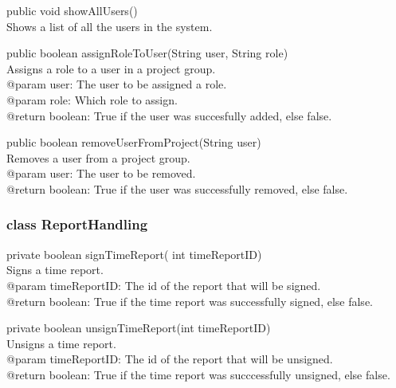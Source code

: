\documentclass[a4paper]{article}
\begin{document}
\begin{hangparas}{1.5em}{1}
public void showAllUsers()\\
Shows a list of all the users in the system.
\end{hangparas}

\vspace{5mm}
\begin{hangparas}{1.5em}{1}
public boolean assignRoleToUser(String user, String role)\\
Assigns a role to a user in a project group.\\
@param user: The user to be assigned a role.\\
@param role: Which role to assign.\\
@return boolean: True if the user was succesfully added, else false.
\end{hangparas}

\vspace{5mm}
\begin{hangparas}{1.5em}{1}
public boolean removeUserFromProject(String user)\\
Removes a user from a project group.\\
@param user: The user to be removed.\\
@return boolean: True if the user was successfully removed, else false.\\
\end{hangparas}


\subsubsection{class ReportHandling}

\begin{hangparas}{1.5em}{1}
private boolean signTimeReport( int timeReportID)\\
Signs a time report.\\
@param timeReportID: The id of the report that will be signed.\\
@return boolean: True if the time report was successfully signed, else false.
\end{hangparas}

\vspace{5mm}
\begin{hangparas}{1.5em}{1}
private boolean unsignTimeReport(int timeReportID)\\
Unsigns a time report.\\
@param timeReportID: The id of the report that will be unsigned.\\
@return boolean: True if the time report was succcessfully unsigned, else false.
\end{hangparas}
\end{document}
